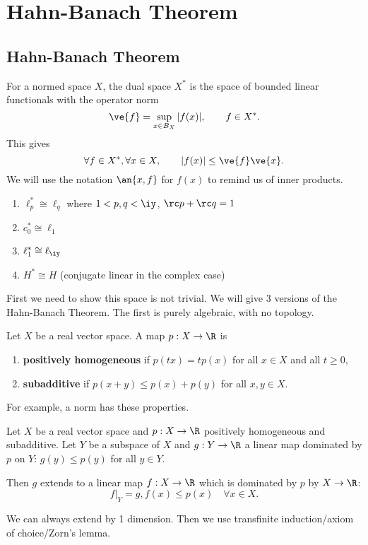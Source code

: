 \chapter{Hahn-Banach Theorem}
\section{Hahn-Banach Theorem}
For a normed space $X$, the dual space $X^*$ is the space of bounded linear functionals with the operator norm
\[
\ve{f}=\sup_{x\in B_X}|f(x)|,\qquad f\in X^*.
\]
This gives
\[
\forall f\in X^*,\forall x\in X,\qquad |f(x)|\le \ve{f}\ve{x}.
\]
We will use the notation $\an{x,f}$ for $f(x)$ to remind us of inner products.
\begin{ex}
\begin{enumerate}
\item
$\ell_p^*\cong \ell_q$ where $1<p,q<\iy$, $\rc p+\rc q=1$
\item
$c_0^*\cong \ell_1$
\item
$\ell_1^*\cong \ell_{\iy}$
\item
$H^*\cong H$ (conjugate linear in the complex case) %
\end{enumerate}
\end{ex}
First we need to show this space is not trivial. 
We will give 3 versions of the Hahn-Banach Theorem. The first is purely algebraic, with no topology.

\begin{df}
Let $X$ be a real vector space. A map $p:X\to \R$ is
\begin{enumerate}
\item
 \textbf{positively homogeneous} if $p(tx)=tp(x)$ for all $x\in X$ and all $t\ge 0$,
\item
\textbf{subadditive} if $p(x+y)\le p(x)+p(y)$ for all $x,y\in X$.
\end{enumerate}
\end{df}
For example, a norm has these properties.
\begin{thm}
Let $X$ be a real vector space and $p:X\to \R$ positively homogeneous and subadditive. Let $Y$ be a subspace of $X$ and $g:Y\to \R$ a linear map dominated by $p$ on $Y$: $g(y)\le p(y)$ for all $y\in Y$.

Then $g$ extends to a linear map $f:X\to \R$ which is dominated by $p$ by $X\to \R$:
\[
f|_Y=g,f(x)\le p(x)\quad\forall x\in X.
\]
\end{thm}
We can always extend by 1 dimension. Then we use transfinite induction/axiom of choice/Zorn's lemma.

